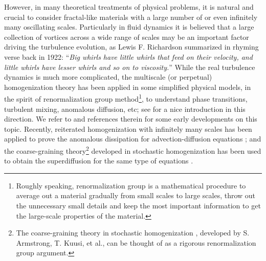 \documentclass[reqno,12pt]{amsart} %
\theoremstyle{definition}
\theoremstyle{remark}
\numberwithin{equation}{section}
\begin{document}
However, in many theoretical treatments of physical problems, it is natural and crucial to consider fractal-like materials with a large number of or even infinitely many oscillating scales. Particularly in fluid dynamics it is believed that a large collection of vortices across a wide range of scales may be an important factor driving the turbulence evolution, as Lewis F. Richardson summarized in rhyming verse \cite{Ric07} back in 1922: ``\textit{Big whirls have little whirls that feed on their velocity, and little whirls have lesser whirls and so on to viscosity.}'' While the real turbulence dynamics is much more complicated, the multiscale (or perpetual) homogenization theory has been applied in some simplified physical models, in the spirit of renormalization group method\footnote{Roughly speaking, renormalization group is a mathematical procedure to average out a material gradually from small scales to large scales, throw out the unnecessary small details and keep the most important information to get the large-scale properties of the material.}, to understand phase transitions, turbulent mixing, anomalous diffusion, etc; see \cite{Ave96} for a nice introduction in this direction. 
We refer to \cite{AM91,FP94,MK99,BO02,BO03} and references therein for some early developments on this topic. Recently, reiterated homogenization with infinitely many scales has been applied to prove the anomalous dissipation for advection-diffusion equations \cite{AV25,BSW23,BSW26}; and the coarse-graining theory\footnote{The coarse-graining theory in stochastic homogenization \cite{AS16,AKM19}, developed by S. Armstrong, T. Kuusi, et al., can be thought of as a rigorous renormalization group argument.} developed in stochastic homogenization has been used to obtain the superdiffusion for the same type of equations \cite{ABK24, ABK26}.



\end{document}

